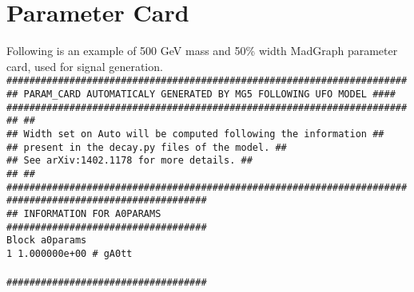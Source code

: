 \graphicspath{{chapt_dutch/}{intro/}{chapt2/}{chapt3/}{chapt4/}{chapt5/}{chapt6/}{chapt7/}}

\renewcommand\evenpagerightmark{{\scshape\small Appendix A}}
\renewcommand\oddpageleftmark{{\scshape\small MadGraph Parameter Card}}

\renewcommand{\bibname}{References}

\hyphenation{}

\chapter[MadGraph Parameter Card]%
{Parameter Card}\label{app1}
Following is an example of 500 GeV mass and 50\% width MadGraph parameter card, used for signal generation.\\
\texttt{\#\#\#\#\#\#\#\#\#\#\#\#\#\#\#\#\#\#\#\#\#\#\#\#\#\#\#\#\#\#\#\#\#\#\#\#\#\#\#\#\#\#\#\#\#\#\#\#\#\#\#\#\#\#\#\#\#\#\#\#\#\#\#\#\#\#\#\#\#\#\\
\#\# PARAM\_CARD AUTOMATICALY GENERATED BY MG5 FOLLOWING UFO MODEL   \#\#\#\#\\
\#\#\#\#\#\#\#\#\#\#\#\#\#\#\#\#\#\#\#\#\#\#\#\#\#\#\#\#\#\#\#\#\#\#\#\#\#\#\#\#\#\#\#\#\#\#\#\#\#\#\#\#\#\#\#\#\#\#\#\#\#\#\#\#\#\#\#\#\#\#\\
\#\#                                                                  \#\#\\
\#\#  Width set on Auto will be computed following the information    \#\#\\
\#\#        present in the decay.py files of the model.               \#\#\\
\#\#        See  arXiv:1402.1178 for more details.                    \#\#\\
\#\#                                                                  \#\#\\
\#\#\#\#\#\#\#\#\#\#\#\#\#\#\#\#\#\#\#\#\#\#\#\#\#\#\#\#\#\#\#\#\#\#\#\#\#\#\#\#\#\#\#\#\#\#\#\#\#\#\#\#\#\#\#\#\#\#\#\#\#\#\#\#\#\#\#\#\#\#\\
\#\#\#\#\#\#\#\#\#\#\#\#\#\#\#\#\#\#\#\#\#\#\#\#\#\#\#\#\#\#\#\#\#\#\#\\
\#\# INFORMATION FOR A0PARAMS\\
\#\#\#\#\#\#\#\#\#\#\#\#\#\#\#\#\#\#\#\#\#\#\#\#\#\#\#\#\#\#\#\#\#\#\#\\
Block a0params \\
    1 1.000000e+00 \# gA0tt\\ 
\\
\#\#\#\#\#\#\#\#\#\#\#\#\#\#\#\#\#\#\#\#\#\#\#\#\#\#\#\#\#\#\#\#\#\#\#\\
}

